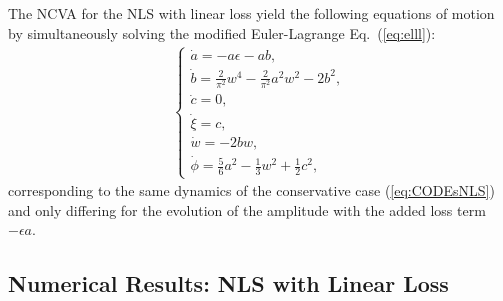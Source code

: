 The NCVA for the NLS with linear loss yield the following equations of motion by simultaneously solving the modified Euler-Lagrange Eq.~(\ref{eq:elll}):
{
\begin{align}
\begin{cases} \dot{a} = - a \epsilon  - a b, \\
\dot{b}  = \frac{2}{\pi^2}w^4 - \frac{2}{\pi^2}a^2 w^2 - 2 b^2, \\
\dot{c} = 0 , \\
\dot{\xi} = c, \\
\dot{w} = -2bw, \\
\dot{\phi} = \frac{5}{6} a^2 - \frac{1}{3} w^2 + \frac{1}{2} c^2,
\end{cases}
\label{eq:NCVALL}
\end{align}} 
corresponding to the same dynamics of the conservative case (\ref{eq:CODEsNLS}) and only differing for the evolution of the amplitude with the added loss term $-\epsilon a$.  
 
\subsection{Numerical Results: NLS with Linear Loss} \label{section:LLnumerics}


